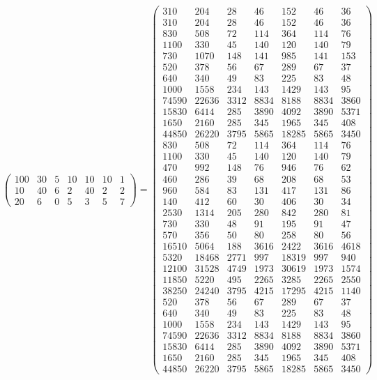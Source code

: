 \documentclass{article}%
\begin{document}
\[\begin{pmatrix}
100&30&5&10&10&10&1\\%
10&40&6&2&40&2&2\\%
20&6&0&5&3&5&7%
\end{pmatrix} = \begin{pmatrix}%
310&204&28&46&152&46&36\\%
310&204&28&46&152&46&36\\%
830&508&72&114&364&114&76\\%
1100&330&45&140&120&140&79\\%
730&1070&148&141&985&141&153\\%
520&378&56&67&289&67&37\\%
640&340&49&83&225&83&48\\%
1000&1558&234&143&1429&143&95\\%
74590&22636&3312&8834&8188&8834&3860\\%
15830&6414&285&3890&4092&3890&5371\\%
1650&2160&285&345&1965&345&408\\%
44850&26220&3795&5865&18285&5865&3450\\%
830&508&72&114&364&114&76\\%
1100&330&45&140&120&140&79\\%
470&992&148&76&946&76&62\\%
460&286&39&68&208&68&53\\%
960&584&83&131&417&131&86\\%
140&412&60&30&406&30&34\\%
2530&1314&205&280&842&280&81\\%
730&330&48&91&195&91&47\\%
570&356&50&80&258&80&56\\%
16510&5064&188&3616&2422&3616&4618\\%
5320&18468&2771&997&18319&997&940\\%
12100&31528&4749&1973&30619&1973&1574\\%
11850&5220&495&2265&3285&2265&2550\\%
38250&24240&3795&4215&17295&4215&1140\\%
520&378&56&67&289&67&37\\%
640&340&49&83&225&83&48\\%
1000&1558&234&143&1429&143&95\\%
74590&22636&3312&8834&8188&8834&3860\\%
15830&6414&285&3890&4092&3890&5371\\%
1650&2160&285&345&1965&345&408\\%
44850&26220&3795&5865&18285&5865&3450%
\end{pmatrix}%
\]%
\end{document}

